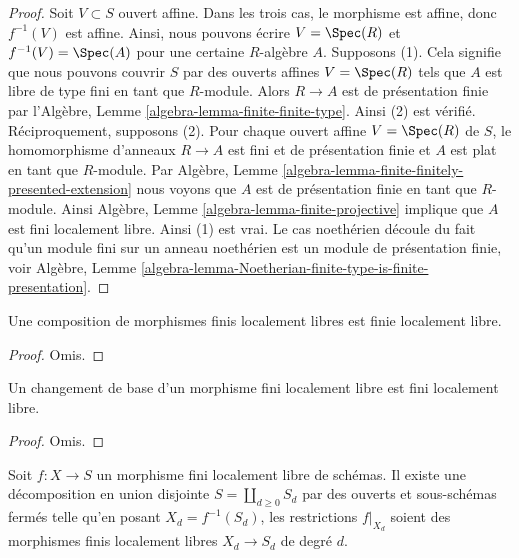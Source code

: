 \begin{proof}
Soit $V \subset S$ ouvert affine. Dans les trois cas, le morphisme
est affine, donc $f^{-1}(V)$ est affine. Ainsi, nous pouvons
écrire $V = \Spec(R)$ et $f^{-1}(V) = \Spec(A)$ pour une certaine $R$-algèbre $A$.
Supposons (1). Cela
signifie que nous pouvons couvrir $S$ par des ouverts affines
$V = \Spec(R)$ tels que $A$ est libre de type fini en tant que $R$-module.
Alors $R \to A$ est de présentation
finie par l’Algèbre, Lemme \ref{algebra-lemma-finite-finite-type}. Ainsi (2) est vérifié. Réciproquement,
supposons (2). Pour chaque ouvert
affine $V = \Spec(R)$ de $S$, le homomorphisme d’anneaux $R \to A$
est fini et de présentation finie et $A$ est plat en tant que
$R$-module. Par
Algèbre, Lemme \ref{algebra-lemma-finite-finitely-presented-extension} nous voyons que $A$ est de présentation
finie en tant que $R$-module.
Ainsi Algèbre, Lemme \ref{algebra-lemma-finite-projective} implique que $A$
est fini localement libre. Ainsi (1)
est vrai. Le cas noethérien découle du fait qu'un module
fini sur un anneau noethérien est un module
de présentation finie, voir Algèbre, Lemme \ref{algebra-lemma-Noetherian-finite-type-is-finite-presentation}.
\end{proof}

\begin{lemma}
\label{lemma-composition-finite-locally-free}
Une composition de morphismes finis localement libres est finie localement libre.
\end{lemma}

\begin{proof}
Omis.
\end{proof}

\begin{lemma}
\label{lemma-base-change-finite-locally-free}
Un changement de base d'un morphisme fini localement libre est fini localement libre.
\end{lemma}

\begin{proof}
Omis.
\end{proof}

\begin{lemma}
\label{lemma-finite-locally-free}
Soit $f : X \to S$ un morphisme fini localement libre de schémas. Il
existe une décomposition en union disjointe
$S = \coprod_{d \geq 0} S_d$ par des ouverts et sous-schémas fermés telle qu'en
posant $X_d = f^{-1}(S_d)$, les restrictions $f|_{X_d}$ soient
des morphismes finis localement libres $X_d \to S_d$ de degré
$d$.
\end{lemma}

